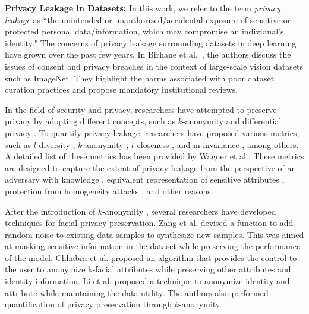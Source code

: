 \documentclass[journal]{IEEEtran}
\begin{document}
\noindent \textbf{Privacy Leakage in Datasets:}
In this work, we refer to the term \textit{privacy leakage} as ``the unintended or unauthorized/accidental exposure of sensitive or protected personal data/information, which may compromise an individual's identity." The concerns of privacy leakage surrounding datasets in deep learning have grown over the past few years. In Birhane et al.~\cite{birhane2021large}, the authors discuss the issues of consent and privacy breaches in the context of large-scale vision datasets such as ImageNet. They highlight the harms associated with poor dataset curation practices and propose mandatory institutional reviews. 

In the field of security and privacy, researchers have attempted to preserve privacy by adopting different concepts, such as $k$-anonymity \cite{samarati1998protecting} and differential privacy \cite{dwork2008differential}. To quantify privacy leakage, researchers have proposed various metrics, such as $l$-diversity \cite{machanavajjhala2007diversity}, $k$-anonymity \cite{samarati1998protecting}, $t$-closeness \cite{li2006t}, and m-invariance \cite{xiao2007m}, among others. A detailed list of these metrics has been provided by Wagner et al.\cite{wagner2018technical}. These metrics are designed to capture the extent of privacy leakage from the perspective of an adversary with knowledge \cite{li2006t}, equivalent representation of sensitive attributes \cite{machanavajjhala2007diversity}, protection from homogeneity attacks \cite{samarati1998protecting}, and other reasons. 

After the introduction of $k$-anonymity \cite{sweeney2002k}, several researchers have developed techniques for facial privacy preservation. Zang et al. \cite{zhang2018privacy} devised a function to add random noise to existing data samples to synthesize new samples. This was aimed at masking sensitive information in the dataset while preserving the performance of the model. Chhabra et al. \cite{chhabra2018anonymizing} proposed an algorithm that provides the control to the user to anonymize k-facial attributes while preserving other attributes and identity information. Li et al. \cite{li2019anonymousnet} proposed a technique to anonymize identity and attribute while maintaining the data utility. The authors also performed quantification of privacy preservation through $k$-anonymity. 
\end{document}
